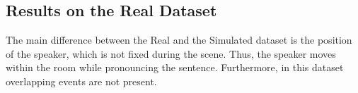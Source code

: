 \documentclass[review]{elsarticle}
\begin{document}
\subsection{Results on the Real Dataset} 
The main difference between the Real and the Simulated  dataset is the position of the speaker, which is not fixed during the scene. Thus, the speaker moves within the room while pronouncing the sentence. Furthermore, in this dataset overlapping events are not present.
\begin{table}[!h]
	\centering
	\caption{Comparison of best results of SLOC algorithms in terms of RMSE (mm) and $P_{cor}$ (\%) in the Real case study. The temporal context is espressed in terms of $C$ - $s$ (frames), respectively the total length of the chunk and the stride.}
	\label{tab:results_REAL}
\end{table}
\end{document}
